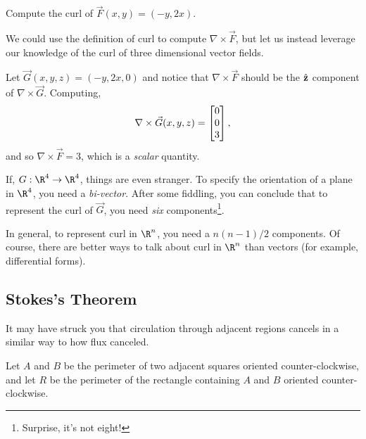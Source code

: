 \begin{example}
	Compute the curl of $\vec F(x,y) = (-y,2x)$.

	We could use the definition of curl to compute $\nabla \times \vec F$, but let
	us instead leverage our knowledge of the curl of three dimensional vector fields.

	Let $\vec G(x,y,z) = (-y, 2x, 0)$ and notice that $\nabla \times \vec F$ should be the
	${\hat {\mathbf z}}$ component of $\nabla \times \vec G$.  Computing,
	\[
		\nabla \times \vec G(x,y,z) = \mat{0\\0\\3},
	\]
	and so $\nabla \times \vec F=3$, which is a \emph{scalar} quantity.
\end{example}

If, $G:\R^4\to\R^4$, things are even stranger.  To specify the orientation
of a plane in $\R^4$, you need a \emph{bi-vector}.  After 
some fiddling, you can conclude that to represent the curl of $\vec G$, you
need \emph{six} components\footnote{ Surprise, it's not eight!}.

In general, to represent curl in $\R^n$, you need a $n(n-1)/2$ components.
Of course, there are better ways to talk about curl in $\R^n$ than vectors
(for example, differential forms).

\subsection{Stokes's Theorem}

It may have struck you that circulation through adjacent regions cancels
in a similar way to how flux canceled.

Let $A$ and $B$ be the perimeter of two adjacent squares oriented counter-clockwise,
and let $R$ be the perimeter of the rectangle containing $A$ and $B$ oriented 
counter-clockwise.

